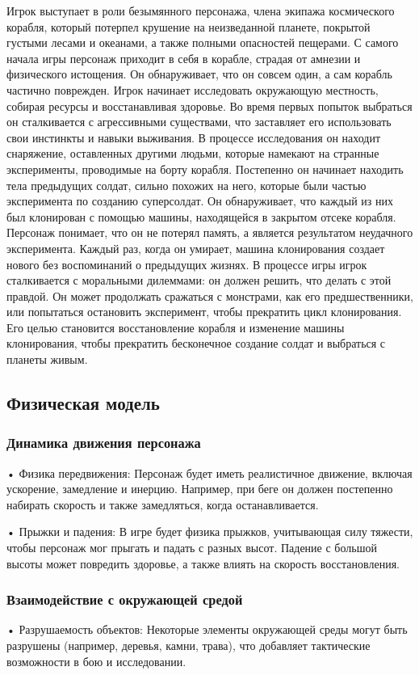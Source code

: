 \documentclass[a4paper,12pt]{article}
\begin{document}
Игрок выступает в роли безымянного персонажа, члена экипажа космического корабля, который потерпел крушение на неизведанной планете, покрытой густыми лесами и океанами, а также полными опасностей пещерами. С самого начала игры персонаж приходит в себя в корабле, страдая от амнезии и физического истощения. Он обнаруживает, что он совсем один, а сам корабль частично поврежден. Игрок начинает исследовать окружающую местность, собирая ресурсы и восстанавливая здоровье. Во время первых попыток выбраться он сталкивается с агрессивными существами, что заставляет его использовать свои инстинкты и навыки выживания. В процессе исследования он находит снаряжение, оставленных другими людьми, которые намекают на странные эксперименты, проводимые на борту корабля. Постепенно он начинает находить тела предыдущих солдат, сильно похожих на него, которые были частью эксперимента по созданию суперсолдат. Он обнаруживает, что каждый из них был клонирован с помощью машины, находящейся в закрытом отсеке корабля. Персонаж понимает, что он не потерял память, а является результатом неудачного эксперимента. Каждый раз, когда он умирает, машина клонирования создает нового без воспоминаний о предыдущих жизнях. В процессе игры игрок сталкивается с моральными дилеммами: он должен решить, что делать с этой правдой. Он может продолжать сражаться с монстрами, как его предшественники, или попытаться остановить эксперимент, чтобы прекратить цикл клонирования. Его целью становится восстановление корабля и изменение машины клонирования, чтобы прекратить бесконечное создание солдат и выбраться с планеты живым.

\subsection{Физическая модель}
\subsubsection{Динамика движения персонажа}
•	Физика передвижения: Персонаж будет иметь реалистичное движение, включая ускорение, замедление и инерцию. Например, при беге он должен постепенно набирать скорость и также замедляться, когда останавливается.

•	Прыжки и падения: В игре будет физика прыжков, учитывающая силу тяжести, чтобы персонаж мог прыгать и падать с разных высот. Падение с большой высоты может повредить здоровье, а также влиять на скорость восстановления.
\subsubsection{Взаимодействие с окружающей средой}
•	Разрушаемость объектов: Некоторые элементы окружающей среды могут быть разрушены (например, деревья, камни, трава), что добавляет тактические возможности в бою и исследовании.
\end{document}
